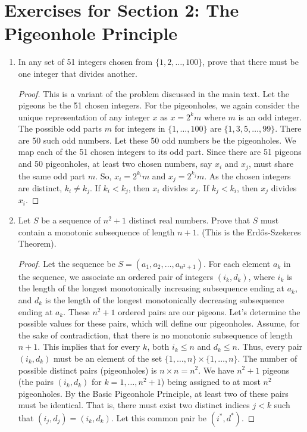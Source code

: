 \section*{Exercises for Section 2: The Pigeonhole Principle}
\begin{enumerate}
    \item {} In any set of 51 integers chosen from $\{1, 2, \dots, 100\}$, prove that there must be one integer that divides another.
    \begin{proof}
    This is a variant of the problem discussed in the main text. Let the pigeons be the 51 chosen integers. For the pigeonholes, we again consider the unique representation of any integer $x$ as $x = 2^k m$ where $m$ is an odd integer. The possible odd parts $m$ for integers in $\{1, \dots, 100\}$ are $\{1, 3, 5, \dots, 99\}$. There are 50 such odd numbers.
    Let these 50 odd numbers be the pigeonholes. We map each of the 51 chosen integers to its odd part. Since there are 51 pigeons and 50 pigeonholes, at least two chosen numbers, say $x_i$ and $x_j$, must share the same odd part $m$.
    So, $x_i = 2^{k_i}m$ and $x_j = 2^{k_j}m$. As the chosen integers are distinct, $k_i \neq k_j$. If $k_i < k_j$, then $x_i$ divides $x_j$. If $k_j < k_i$, then $x_j$ divides $x_i$.
    \end{proof}

    \item {} Let $S$ be a sequence of $n^2+1$ distinct real numbers. Prove that $S$ must contain a monotonic subsequence of length $n+1$. (This is the Erd\H{o}s-Szekeres Theorem).
    \begin{proof}
    Let the sequence be $S = (a_1, a_2, \dots, a_{n^2+1})$. For each element $a_k$ in the sequence, we associate an ordered pair of integers $(i_k, d_k)$, where $i_k$ is the length of the longest monotonically increasing subsequence ending at $a_k$, and $d_k$ is the length of the longest monotonically decreasing subsequence ending at $a_k$.
    These $n^2+1$ ordered pairs are our pigeons. Let's determine the possible values for these pairs, which will define our pigeonholes.
    Assume, for the sake of contradiction, that there is no monotonic subsequence of length $n+1$. This implies that for every $k$, both $i_k \le n$ and $d_k \le n$.
    Thus, every pair $(i_k, d_k)$ must be an element of the set $\{1, \dots, n\} \times \{1, \dots, n\}$. The number of possible distinct pairs (pigeonholes) is $n \times n = n^2$.
    We have $n^2+1$ pigeons (the pairs $(i_k, d_k)$ for $k=1, \dots, n^2+1$) being assigned to at most $n^2$ pigeonholes. By the Basic Pigeonhole Principle, at least two of these pairs must be identical. That is, there must exist two distinct indices $j < k$ such that $(i_j, d_j) = (i_k, d_k)$. Let this common pair be $(i^*, d^*)$.
    

\end{proof}
\end{enumerate}
